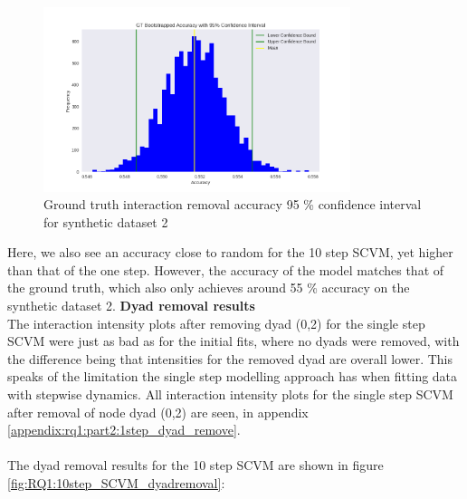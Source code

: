 \begin{figure}[H]
    \centering
    \includegraphics[width=0.8\textwidth]{0_images/10step_SCVM_GT_Accuracy_Plot.png}
    \caption{Ground truth interaction removal accuracy 95 \% confidence interval for synthetic dataset 2}
    \label{fig:RQ1:GT10_SCVM_accuracy}
\end{figure}
\noindent
Here, we also see an accuracy close to random for the 10 step SCVM, yet higher than that of the one step. 
However, the accuracy of the model matches that of the ground truth, which also only achieves around 55 \% accuracy on the synthetic dataset 2.
\clearpage
\vspace*{-2cm}
\noindent
\textbf{Dyad removal results}
\\
The interaction intensity plots after removing dyad (0,2) for the single step SCVM were just as bad as for the initial fits, where no dyads were removed, with the difference being that intensities for the removed dyad are overall lower.
This speaks of the limitation the single step modelling approach has when fitting data with stepwise dynamics. 
All interaction intensity plots for the single step SCVM after removal of node dyad (0,2) are seen, in appendix \ref{appendix:rq1:part2:1step_dyad_remove}.
\\\\
The dyad removal results for the 10 step SCVM are shown in figure \ref{fig:RQ1:10step_SCVM_dyadremoval}:
